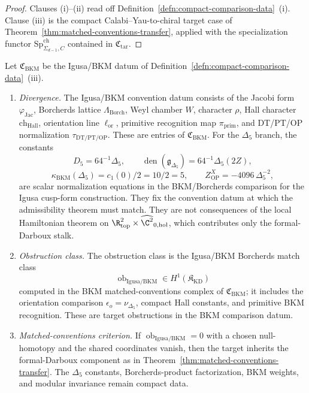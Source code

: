 \begin{proof}
  Clauses (i)--(ii) read off
  Definition~\ref{defn:compact-comparison-data}~(i).
  Clause (iii) is the compact Calabi--Yau-to-chiral target case of
  Theorem~\ref{thm:matched-conventions-transfer}, applied with the
  specialization functor \(\mathrm{Sp}^{\mathrm{ch}}_{\Sigma_{d-1},C}\) contained in
  \(\mathfrak C_{\mathrm{tar}}\).
\end{proof}

\begin{thm}\label{thm:divergence-igusa-bkm}
  Let \(\mathfrak C_{\mathrm{BKM}}\) be the Igusa/BKM datum of
  Definition~\ref{defn:compact-comparison-data}~(iii).
  \begin{enumerate}[label=(\roman*)]
    \item \emph{Divergence.}  The Igusa/BKM convention datum consists
      of the Jacobi form \(\varphi_{\mathrm{Jac}}\), Borcherds
      lattice \(\Lambda_{\mathrm{Borch}}\), Weyl chamber \(W\),
      character \(\rho\), Hall character
      \(\mathrm{ch}_{\mathrm{Hall}}\), orientation line
      \(\ell_{\mathrm{or}}\), primitive recognition map
      \(\pi_{\mathrm{prim}}\), and DT/PT/OP normalization
      \(\tau_{\mathrm{DT/PT/OP}}\).  These are entries of
      \(\mathfrak C_{\mathrm{BKM}}\).  For the \(\Delta_5\) branch, the constants
      \[
        D_5=64^{-1}\Delta_5,\qquad
        \operatorname{den}(\mathfrak g_{\Delta_5})
          =64^{-1}\Delta_5(2Z),
      \]
      \[
        \kappa_{\mathrm{BKM}}(\Delta_5)=c_1(0)/2=10/2=5,\qquad
        Z^X_{\mathrm{OP}}=-4096\,\Delta_5^{-2},
      \]
      are scalar normalization equations in the BKM/Borcherds comparison
      for the Igusa cusp-form construction.  They fix the convention
      datum at which the admissibility theorem must match.  They are not
      consequences of the local Hamiltonian theorem on
      \(\R^2_{\mathrm{top}}\times\widehat{\C^2}_{0,\mathrm{hol}}\),
      which contributes only the formal-Darboux stalk.
    \item \emph{Obstruction class.}  The obstruction class is
      the Igusa/BKM Borcherds match class
      \[
        \operatorname{ob}_{\mathrm{Igusa/BKM}}
          \in
          H^1(\mathfrak K_{\mathrm{KD}})
      \]
      computed in the BKM matched-conventions complex of
      \(\mathfrak C_{\mathrm{BKM}}\); it includes the orientation
      comparison \(\epsilon_o=\nu_{\Delta_5}\), compact Hall constants,
      and primitive BKM recognition.  These are target obstructions in
      the BKM comparison datum.
    \item \emph{Matched-conventions criterion.}  If
      \(\operatorname{ob}_{\mathrm{Igusa/BKM}}=0\) with a chosen
      null-homotopy and the shared coordinates vanish, then the
      target inherits the formal-Darboux component as in
      Theorem~\ref{thm:matched-conventions-transfer}.  The
      \(\Delta_5\) constants, Borcherds-product factorization, BKM
      weights, and modular invariance remain compact data.
  \end{enumerate}
\end{thm}

